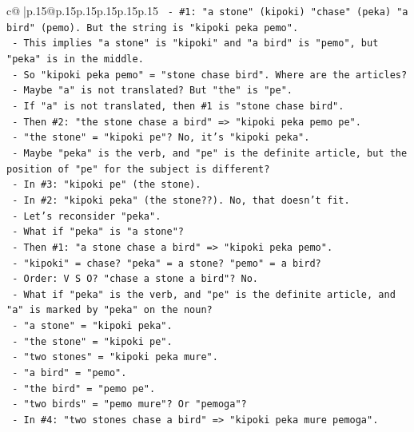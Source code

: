 \documentclass{article}
\begin{document}
{\begin{supertabular}{c@{$\;$}|p{.15\linewidth}@{}p{.15\linewidth}p{.15\linewidth}p{.15\linewidth}p{.15\linewidth}p{.15\linewidth}}
{{{\texttt{      {-} \#1: "a stone" (kipoki) "chase" (peka) "a bird" (pemo). But the string is "kipoki peka pemo".} \\
\texttt{        {-} This implies "a stone" is "kipoki" and "a bird" is "pemo", but "peka" is in the middle.} \\
\texttt{        {-} So "kipoki peka pemo" = "stone chase bird". Where are the articles?} \\
\texttt{        {-} Maybe "a" is not translated? But "the" is "pe".} \\
\texttt{        {-} If "a" is not translated, then \#1 is "stone chase bird".} \\
\texttt{        {-} Then \#2: "the stone chase a bird" => "kipoki peka pemo pe".} \\
\texttt{          {-} "the stone" = "kipoki pe"? No, it's "kipoki peka".} \\
\texttt{          {-} Maybe "peka" is the verb, and "pe" is the definite article, but the position of "pe" for the subject is different?} \\
\texttt{          {-} In \#3: "kipoki pe" (the stone).} \\
\texttt{          {-} In \#2: "kipoki peka" (the stone??). No, that doesn't fit.} \\
\texttt{          {-} Let's reconsider "peka".} \\
\texttt{          {-} What if "peka" is "a stone"?} \\
\texttt{          {-} Then \#1: "a stone chase a bird" => "kipoki peka pemo".} \\
\texttt{            {-} "kipoki" = chase? "peka" = a stone? "pemo" = a bird?} \\
\texttt{            {-} Order: V S O? "chase a stone a bird"? No.} \\
\texttt{          {-} What if "peka" is the verb, and "pe" is the definite article, and "a" is marked by "peka" on the noun?} \\
\texttt{          {-} "a stone" = "kipoki peka".} \\
\texttt{          {-} "the stone" = "kipoki pe".} \\
\texttt{          {-} "two stones" = "kipoki peka mure".} \\
\texttt{          {-} "a bird" = "pemo".} \\
\texttt{          {-} "the bird" = "pemo pe".} \\
\texttt{          {-} "two birds" = "pemo mure"? Or "pemoga"?} \\
\texttt{          {-} In \#4: "two stones chase a bird" => "kipoki peka mure pemoga".} \\
}}}
\end{supertabular}}
\end{document}
